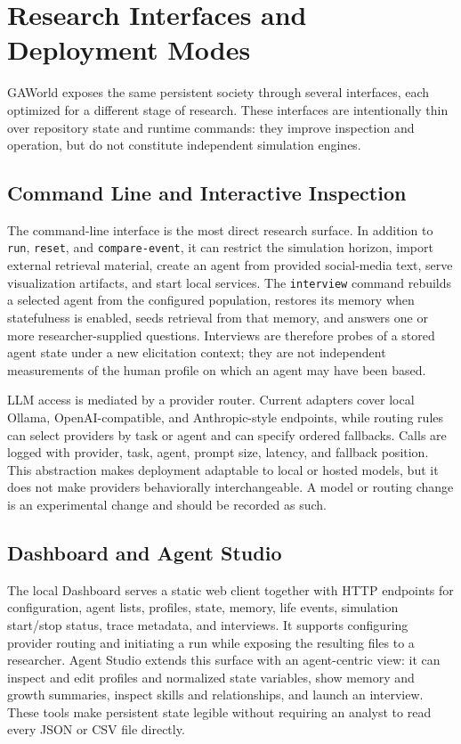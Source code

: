 \section{Research Interfaces and Deployment Modes}
\label{sec:interfaces-deployment}

GAWorld exposes the same persistent society through several interfaces, each
optimized for a different stage of research.  These interfaces are intentionally
thin over repository state and runtime commands: they improve inspection and
operation, but do not constitute independent simulation engines.

\subsection{Command Line and Interactive Inspection}

The command-line interface is the most direct research surface.  In addition to
\texttt{run}, \texttt{reset}, and \texttt{compare-event}, it can restrict the
simulation horizon, import external retrieval material, create an agent from
provided social-media text, serve visualization artifacts, and start local
services.  The \texttt{interview} command rebuilds a selected agent from the
configured population, restores its memory when statefulness is enabled, seeds
retrieval from that memory, and answers one or more researcher-supplied
questions.  Interviews are therefore probes of a stored agent state under a
new elicitation context; they are not independent measurements of the human
profile on which an agent may have been based.

LLM access is mediated by a provider router.  Current adapters cover local
Ollama, OpenAI-compatible, and Anthropic-style endpoints, while routing rules can
select providers by task or agent and can specify ordered fallbacks.  Calls are
logged with provider, task, agent, prompt size, latency, and fallback position.
This abstraction makes deployment adaptable to local or hosted models, but it
does not make providers behaviorally interchangeable.  A model or routing
change is an experimental change and should be recorded as such.

\subsection{Dashboard and Agent Studio}

The local Dashboard serves a static web client together with HTTP endpoints for
configuration, agent lists, profiles, state, memory, life events, simulation
start/stop status, trace metadata, and interviews.  It supports configuring
provider routing and initiating a run while exposing the resulting files to a
researcher.  Agent Studio extends this surface with an agent-centric view: it
can inspect and edit profiles and normalized state variables, show memory and
growth summaries, inspect skills and relationships, and launch an interview.
These tools make persistent state legible without requiring an analyst to read
every JSON or CSV file directly.

